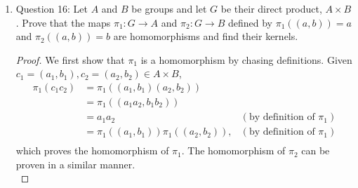 \documentclass{article}
\begin{document}
\begin{enumerate}
\begin{enumerate}
\begin{proof}
          If $\ker(\varphi)$ contains one non-identity element $g$, then
          $\varphi(g)=\varphi(1_G)=1_H$, so $\varphi$ cannot be injective.
          To show the converse, assume that $\varphi$ is not injective.
          Then there exists $g_1\neq g_2\in G$ such that
          $\varphi(g_1)=\varphi(g_2)$. Then
          \begin{align*}
            \varphi(g_1g_2^{-1})  & = \varphi(g_1)\circ\varphi(g_2^{-1})  &
            (\because\varphi\,\text{is a homomorphism}) \\
              & = \varphi(g_1)\circ\varphi(g_2)^{-1} & (\because
              g_1\in\ker(\varphi)\,\text{and homomorphisms preserve inverses}) \\
              & = \varphi(g_1)\circ\varphi(g_1)^{-1} &
              (\because\varphi(g_1)=\varphi(g_2)) \\
              & = 1_H, \\
          \end{align*}
          which implies that $g_1g_2^{-1}\in\ker(\varphi)$. Now
          $g_1g_2^{-1}\neq1_G$ otherwise $g_1=g_2$, so we $\ker(\varphi)$
          contains a non-identity element $g_1g_2^{-1}$. 
        \end{proof}

      \item Question 16: Let $A$ and $B$ be groups and let $G$ be their
        direct product, $A\times B$. Prove that the maps
        $\pi_1:G\rightarrow A$ and $\pi_2:G\rightarrow B$ defined by
        $\pi_1((a,b))=a$ and $\pi_2((a,b))=b$ are homomorphisms and find
        their kernels.

        \begin{proof}
          We first show that $\pi_1$ is a homomorphism by chasing
          definitions. Given $c_1=(a_1,b_1),c_2=(a_2,b_2)\in A\times B$,
          \begin{align*}
            \pi_1(c_1c_2) & = \pi_1((a_1,b_1)(a_2,b_2))  & \\
                          & = \pi_1((a_1a_2,b_1b_2))     & \\
                          & = a_1a_2  & (\text{by definition of $\pi_1$}) \\
                          & = \pi_1((a_1,b_1))\pi_1((a_2,b_2)), & (\text{by definition of $\pi_1$}) \\
          \end{align*}
          which proves the homomorphism of $\pi_1$. The homomorphism of
          $\pi_2$ can be proven in a similar manner. \\


\end{proof}
\end{enumerate}
\end{enumerate}
\end{document}
